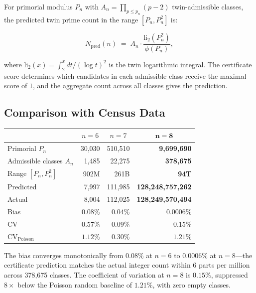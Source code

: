 \documentclass[11pt]{article}
\begin{document}
For primorial modulus $P_n$ with $A_n = \prod_{p \le p_n}(p-2)$ twin-admissible
classes, the predicted twin prime count in the range $[P_n, P_n^{\!2}]$ is:

\begin{equation}
N_\mathrm{pred}(n) \;=\; A_n \cdot \frac{\mathrm{li}_2(P_n^{\!2})}{\phi(P_n)},
\end{equation}

\noindent where $\mathrm{li}_2(x) = \int_2^x dt/(\log t)^2$ is the twin logarithmic
integral. The certificate score determines which candidates in each admissible
class receive the maximal score of $1$, and the aggregate count across all classes
gives the prediction.

\subsection{Comparison with Census Data}

{\centering
\begin{tabular}{@{}lrrr@{}}
\toprule
& \multicolumn{1}{c}{$n=6$}
& \multicolumn{1}{c}{$n=7$}
& \multicolumn{1}{c}{$\mathbf{n=8}$} \\
\midrule
Primorial $P_n$ & 30{,}030 & 510{,}510 & \textbf{9{,}699{,}690} \\
Admissible classes $A_n$ & 1{,}485 & 22{,}275 & \textbf{378{,}675} \\
Range $[P_n, P_n^{\!2}]$ & 902M & 261B & \textbf{94T} \\
Predicted & 7{,}997 & 111{,}985 & \textbf{128{,}248{,}757{,}262} \\
Actual & 8{,}004 & 112{,}025 & \textbf{128{,}249{,}570{,}494} \\
Bias & $0.08\%$ & $0.04\%$ & $\mathbf{0.0006\%}$ \\
CV & $0.57\%$ & $0.09\%$ & $\mathbf{0.15\%}$ \\
CV$_\mathrm{Poisson}$ & $1.12\%$ & $0.30\%$ & $\mathbf{1.21\%}$ \\
\bottomrule
\end{tabular}
\par}

\vspace{1em}

\noindent The bias converges monotonically from $0.08\%$ at $n=6$ to $0.0006\%$ at $n=8$---the certificate prediction matches the actual integer
count within 6 parts per million across 378{,}675 classes. The coefficient
of variation at $n=8$ is $0.15\%$, suppressed $8\times$ below the Poisson
random baseline of $1.21\%$, with zero empty classes.
\end{document}
